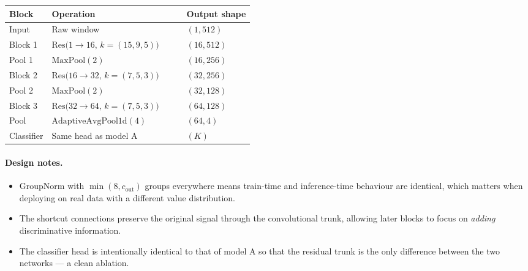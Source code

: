 \begin{table}[H]
    \centering
    \footnotesize
    \begin{tabular}{@{}l p{0.55\linewidth} l@{}}
        \toprule
        \textbf{Block} & \textbf{Operation} & \textbf{Output shape} \\
        \midrule
        Input       & Raw window                                                              & $(1, 512)$ \\
        Block 1     & $\mathrm{Res}\bigl( 1 \to 16, \, k{=}(15,9,5) \bigr)$                   & $(16, 512)$ \\
        Pool 1      & $\mathrm{MaxPool}(2)$                                                   & $(16, 256)$ \\
        Block 2     & $\mathrm{Res}\bigl( 16 \to 32, \, k{=}(7,5,3) \bigr)$                   & $(32, 256)$ \\
        Pool 2      & $\mathrm{MaxPool}(2)$                                                   & $(32, 128)$ \\
        Block 3     & $\mathrm{Res}\bigl( 32 \to 64, \, k{=}(7,5,3) \bigr)$                   & $(64, 128)$ \\
        Pool        & $\mathrm{AdaptiveAvgPool1d}(4)$                                          & $(64, 4)$ \\
        Classifier  & Same head as model A                                                    & $(K)$ \\
        \bottomrule
    \end{tabular}
\end{table}

\paragraph{Design notes.}
\begin{itemize}[leftmargin=*, itemsep=0.2em]
    \item GroupNorm with $\min(8, c_{\text{out}})$ groups everywhere
    means train-time and inference-time behaviour are identical, which
    matters when deploying on real data with a different value
    distribution.
    \item The shortcut connections preserve the original signal
    through the convolutional trunk, allowing later blocks to focus on
    \emph{adding} discriminative information.
    \item The classifier head is intentionally identical to that of
    model A so that the residual trunk is the only difference between
    the two networks --- a clean ablation.
\end{itemize}

